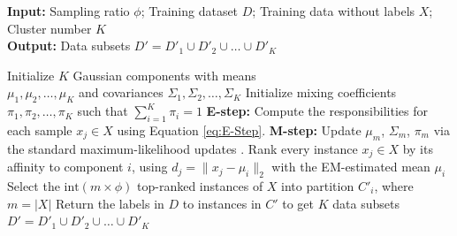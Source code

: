 \documentclass[lettersize,journal]{IEEEtran}
\begin{document}
	\begin{algorithm}[!t]
		\caption{GMM Sampling}
		\label{algo:gmm}
		\textbf{Input:} Sampling ratio $\phi$; Training dataset $D$; Training data without labels $X$; Cluster number $K$ \\
		\textbf{Output:} Data subsets $D' = D'_1 \cup D'_2 \cup \dots \cup D'_K$
		\begin{algorithmic}[1]
			\State Initialize $K$ Gaussian components with means \\
			$\mu_1, \mu_2, \dots, \mu_K$ and covariances $\Sigma_1, \Sigma_2, \dots, \Sigma_K$
			\State Initialize mixing coefficients $\pi_1, \pi_2, \dots, \pi_K$ such that $\sum_{i=1}^{K} \pi_i = 1$
			\Repeat
			\State \textbf{E-step:} Compute the responsibilities for each sample $x_j \in X$ using Equation \ref{eq:E-Step}.
			\State \textbf{M-step:} Update $\mu_m$, $\Sigma_m$, $\pi_m$ via the standard maximum-likelihood updates \cite{dempster_maximum_1977}.
			\State Rank every instance $x_j \in X$ by its affinity to component $i$, using $d_j = \lVert x_j - \mu_i \rVert_2$ with the EM-estimated mean $\mu_i$
			\State Select the $\text{int}(m \times \phi)$ top-ranked instances of $X$ into partition $C'_i$, where $m = |X|$
			\EndFor
			\State {}
			\State Return the labels in $D$ to instances in $C'$ to get $K$ data subsets $D' = D'_1 \cup D'_2 \cup \dots \cup D'_K$
			\EndProcedure
		\end{algorithmic}
	\end{algorithm}
	
\end{document}
